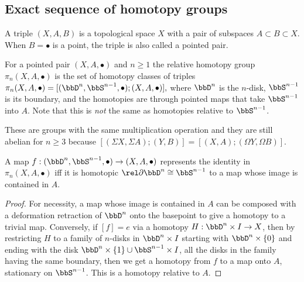 \subsection{Exact sequence of homotopy groups}

\begin{defn}
    A triple $(X,A,B)$ is a topological space $X$ with a pair of subspaces $A\subset B\subset X$. When $B=\bullet$ is a point, the triple is also called a pointed pair.
\end{defn}

\begin{defn}
        For a pointed pair $(X,A,\bullet)$ and $n\geq 1$ the relative homotopy group $\pi_n(X,A,\bullet)$ is the set of homotopy classes of triples $\pi_n(X,A,\bullet)=[(\bbD^n,\bbS^{n-1},\bullet);(X,A,\bullet)],$
        where $\bbD^n$ is the $n$-disk, $\bbS^{n-1}$ is its boundary, and the homotopies are through pointed maps that take $\bbS^{n-1}$ into $A$. Note that this is \emph{not} the same as homotopies relative to $\bbS^{n-1}$.
\end{defn}
These are groups with the same multiplication operation and they are still abelian for $n\geq 3$ because $[(\Sigma X,\Sigma A);(Y,B)]=[( X, A);(\Omega Y,\Omega B)]$.
\begin{prop}\label{prop: compression criterion}
    A map $f:(\bbD^n,\bbS^{n-1},\bullet)\to (X,A,\bullet)$ represents the identity in $\pi_n(X,A,\bullet)$ iff it is homotopic $\rel \partial \bbD^n\cong \bbS^{n-1}$ to a map whose image is contained in $A$.
\end{prop}
\begin{proof}
    For necessity, a map whose image is contained in $A$ can be composed with a deformation retraction of $\bbD^n$ onto the basepoint to give a homotopy to a trivial map. Conversely, if $[f]=e$ via a homotopy $H:\bbD^n\times I\to X$, then by restricting $H$ to a family of $n$-disks in $\bbD^n\times I$ starting with $\bbD^n\times \{0\}$ and ending with the disk $\bbD^n\times\{1\}\cup \bbS^{n-1}\times I$, all the disks in the family having the same boundary, then we get a homotopy from $f$ to a map onto $A$, stationary on $\bbS^{n-1}$. This is a homotopy relative to $A$.
\end{proof}

